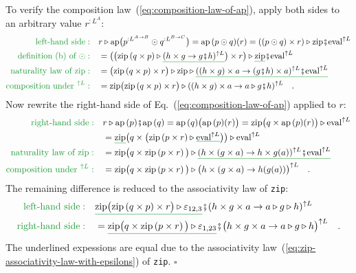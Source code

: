 To verify the composition law~(\ref{eq:composition-law-of-ap}),
apply both sides to an arbitrary value $r^{:L^{A}}$:
\begin{align*}
{\color{greenunder}\text{left-hand side}:}\quad & r\triangleright\text{ap}\big(p^{:L^{A\rightarrow B}}\odot q^{:L^{B\rightarrow C}}\big)=\text{ap}\,(p\odot q)(r)=((p\odot q)\times r)\triangleright\text{zip}\bef\text{eval}^{\uparrow L}\\
{\color{greenunder}\text{definition (b) of }\odot:}\quad & =\big(\big(\text{zip}\left(q\times p\right)\triangleright\gunderline{(h\times g\rightarrow g\bef h)^{\uparrow L}}\big)\times r\big)\triangleright\gunderline{\text{zip}}\bef\text{eval}^{\uparrow L}\\
{\color{greenunder}\text{naturality law of }\text{zip}:}\quad & =\big(\text{zip}\left(q\times p\right)\times r\big)\triangleright\text{zip}\triangleright\gunderline{((h\times g)\times a\rightarrow(g\bef h)\times a)^{\uparrow L}\bef\text{eval}^{\uparrow L}}\\
{\color{greenunder}\text{composition under }^{\uparrow L}:}\quad & =\text{zip}\big(\text{zip}\left(q\times p\right)\times r\big)\triangleright((h\times g)\times a\rightarrow a\triangleright g\bef h)^{\uparrow L}\quad.
\end{align*}
Now rewrite the right-hand side of Eq.~(\ref{eq:composition-law-of-ap})
applied to $r$:
\begin{align*}
{\color{greenunder}\text{right-hand side}:}\quad & r\triangleright\text{ap}\,(p)\bef\text{ap}\,(q)=\text{ap}\,(q)\big(\text{ap}\,(p)(r)\big)=\text{zip}\big(q\times\text{ap}\,(p)(r)\big)\triangleright\text{eval}^{\uparrow L}\\
 & =\gunderline{\text{zip}}\big(q\times\big(\text{zip}\,(p\times r)\triangleright\gunderline{\text{eval}^{\uparrow L}}\big)\big)\triangleright\text{eval}^{\uparrow L}\\
{\color{greenunder}\text{naturality law of }\text{zip}:}\quad & =\text{zip}\big(q\times\text{zip}\left(p\times r\right)\big)\triangleright\gunderline{(h\times(g\times a)\rightarrow h\times g(a))^{\uparrow L}\bef\text{eval}^{\uparrow L}}\\
{\color{greenunder}\text{composition under }^{\uparrow L}:}\quad & =\text{zip}\big(q\times\text{zip}\left(p\times r\right)\big)\triangleright\big(h\times(g\times a)\rightarrow h(g(a))\big)^{\uparrow L}\quad.
\end{align*}
The remaining difference is reduced to the associativity law of \lstinline!zip!:
\begin{align*}
{\color{greenunder}\text{left-hand side}:}\quad & \gunderline{\text{zip}\big(\text{zip}\left(q\times p\right)\times r\big)\triangleright\varepsilon_{12,3}}\bef(h\times g\times a\rightarrow a\triangleright g\triangleright h)^{\uparrow L}\\
{\color{greenunder}\text{right-hand side}:}\quad & =\gunderline{\text{zip}\big(q\times\text{zip}\left(p\times r\right)\big)\triangleright\varepsilon_{1,23}}\bef\big(h\times g\times a\rightarrow a\triangleright g\triangleright h\big)^{\uparrow L}\quad.
\end{align*}
The underlined expessions are equal due to the associativity law~(\ref{eq:zip-associativity-law-with-epsilons})
of \lstinline!zip!. $\square$

